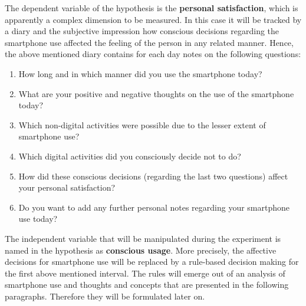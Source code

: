 \documentclass[11pt,a4paper]{article}
\begin{document}
The dependent variable of the hypothesis is the \textbf{personal satisfaction}, which is apparently a complex dimension to be measured. In this case it will be tracked by a diary and the subjective impression how conscious decisions regarding the smartphone use affected the feeling of the person in any related manner. Hence, the above mentioned diary contains for each day notes on the following questions:
\begin{enumerate}
\item 
How long and in which manner did you use the smartphone today?

\item
What are your positive and negative thoughts on the use of the smartphone today?

\item
Which non-digital activities were possible due to the lesser extent of smartphone use?

\item
Which digital activities did you consciously decide not to do?

\item
How did these conscious decisions (regarding the last two questions) affect your personal satisfaction?

\item
Do you want to add any further personal notes regarding your smartphone use today?

\end{enumerate}

The independent variable that will be manipulated during the experiment is named in the hypothesis as \textbf{conscious usage}. More precisely, the affective decisions for smartphone use will be replaced by a rule-based decision making for the first above mentioned interval. The rules will emerge out of an analysis of smartphone use and thoughts and concepts that are presented in the following paragraphs. Therefore they will be formulated later on.
\end{document}
